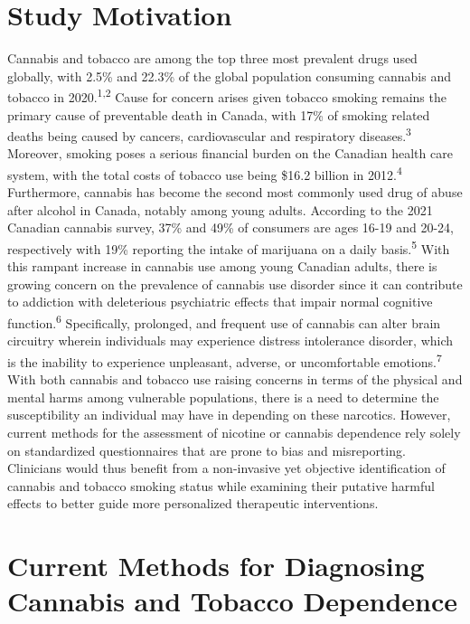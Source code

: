 \documentclass[journal=jacsat,manuscript=article]{achemso}
\begin{document}
\hypertarget{study-motivation}{%
\section{Study Motivation}\label{study-motivation}}

Cannabis and tobacco are among the top three most prevalent drugs used
globally, with 2.5\% and 22.3\% of the global population consuming
cannabis and tobacco in 2020.\textsuperscript{1,2} Cause for concern
arises given tobacco smoking remains the primary cause of preventable
death in Canada, with 17\% of smoking related deaths being caused by
cancers, cardiovascular and respiratory diseases.\textsuperscript{3}
Moreover, smoking poses a serious financial burden on the Canadian
health care system, with the total costs of tobacco use being \$16.2
billion in 2012.\textsuperscript{4} Furthermore, cannabis has become the
second most commonly used drug of abuse after alcohol in Canada, notably
among young adults. According to the 2021 Canadian cannabis survey, 37\%
and 49\% of consumers are ages 16-19 and 20-24, respectively with 19\%
reporting the intake of marijuana on a daily basis.\textsuperscript{5}
With this rampant increase in cannabis use among young Canadian adults,
there is growing concern on the prevalence of cannabis use disorder
since it can contribute to addiction with deleterious psychiatric
effects that impair normal cognitive function.\textsuperscript{6}
Specifically, prolonged, and frequent use of cannabis can alter brain
circuitry wherein individuals may experience distress intolerance
disorder, which is the inability to experience unpleasant, adverse, or
uncomfortable emotions.\textsuperscript{7} With both cannabis and
tobacco use raising concerns in terms of the physical and mental harms
among vulnerable populations, there is a need to determine the
susceptibility an individual may have in depending on these narcotics.
However, current methods for the assessment of nicotine or cannabis
dependence rely solely on standardized questionnaires that are prone to
bias and misreporting. Clinicians would thus benefit from a non-invasive
yet objective identification of cannabis and tobacco smoking status
while examining their putative harmful effects to better guide more
personalized therapeutic interventions.

\hypertarget{current-methods-for-diagnosing-cannabis-and-tobacco-dependence}{%
\section{Current Methods for Diagnosing Cannabis and Tobacco
Dependence}\label{current-methods-for-diagnosing-cannabis-and-tobacco-dependence}}
\end{document}

